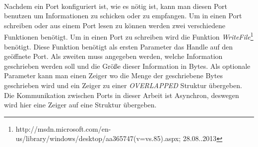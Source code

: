 \paragraph{}
Nachdem ein Port konfiguriert ist, wie es nötig ist, kann man diesen Port benutzen um Informationen zu schicken oder zu empfangen. Um in einen Port schreiben oder aus einem Port lesen zu können  werden zwei verschiedene Funktionen benötigt. Um in einen Port zu schreiben wird die Funktion \textit{WriteFile}\footnote{http://msdn.microsoft.com/en-us/library/windows/desktop/aa365747(v=vs.85).aspx; 28.08..2013} benötigt. Diese Funktion benötigt als ersten Parameter das Handle auf den geöffnete Port. Als zweiten muss angegeben werden, welche Information geschrieben werden soll und die Größe dieser Information in Bytes. Als optionale Parameter kann man einen Zeiger wo die Menge der geschriebene Bytes geschrieben wird und ein Zeiger zu einer \textit{OVERLAPPED} Struktur übergeben. Die Kommunikation zwischen Ports in dieser Arbeit ist Asynchron, deswegen wird hier eine Zeiger auf eine Struktur übergeben.
\\

